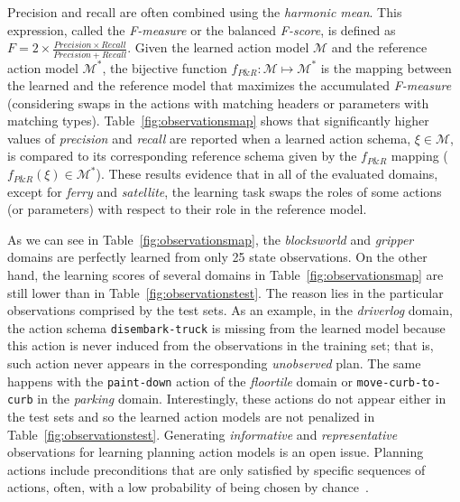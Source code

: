 \documentclass[3p,times]{elsarticle}
\begin{document}
Precision and recall are often combined using the {\em harmonic mean}. This expression, called the {\em F-measure} or the balanced {\em F-score}, is defined as $F=2\times\frac{Precision\times Recall}{Precision+Recall}$. Given the learned action model $\mathcal{M}$ and the reference action model $\mathcal{M}^*$, the bijective function $f_{P\&R}:\mathcal{M} \mapsto \mathcal{M}^*$ is the mapping between the learned and the reference model that maximizes the accumulated {\em F-measure} (considering swaps in the actions with matching headers or parameters with matching types). Table~\ref{fig:observationsmap} shows that significantly higher values of {\em precision} and {\em recall} are reported when a learned action schema, $\xi\in\mathcal{M}$, is compared to its corresponding reference schema given by the $f_{P\&R}$ mapping ($f_{P\&R}(\xi)\in \mathcal{M}^*$). These results evidence that in all of the evaluated domains, except for {\em ferry} and {\em satellite}, the learning task swaps the roles of some actions (or parameters) with respect to their role in the reference model.

As we can see in Table~\ref{fig:observationsmap}, the {\em blocksworld} and {\em gripper} domains are perfectly learned from only 25 state observations. On the other hand, the learning scores of several domains in Table~\ref{fig:observationsmap} are still lower than in Table~\ref{fig:observationstest}. The reason lies in the particular observations comprised by the test sets.
As an example, in the {\em driverlog} domain, the action schema {\small \tt disembark-truck} is missing from the learned model because this action is never induced from the observations in the training set; that is, such action never appears in the corresponding \emph{unobserved} plan. The same happens with the {\small \tt paint-down} action of the {\em floortile} domain or {\small \tt move-curb-to-curb} in the {\em parking} domain. Interestingly, these actions do not appear either in the test sets and so the learned action models are not penalized in Table~\ref{fig:observationstest}. Generating {\em informative} and {\em representative} observations for learning planning action models is an open issue. Planning actions include preconditions that are only satisfied by specific sequences of actions, often, with a low probability of being chosen by chance~\cite{fern2004learning}.
\end{document}
